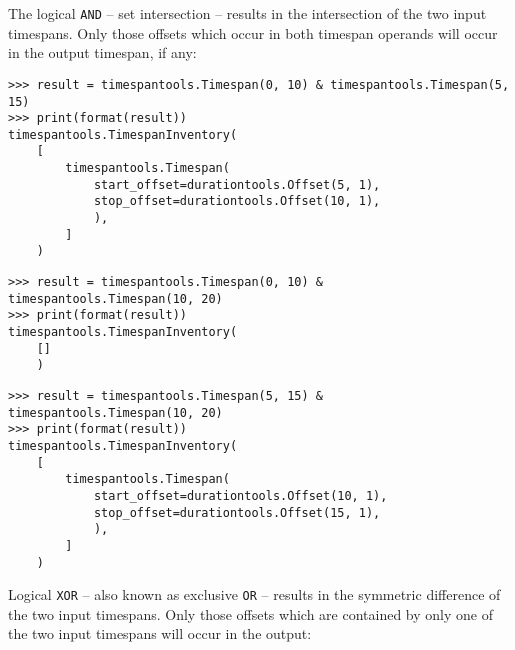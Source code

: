 \noindent The logical \texttt{AND} -- set intersection -- results in the
intersection of the two input timespans. Only those offsets which occur in both
timespan operands will occur in the output timespan, if any:

\begin{comment}
<abjad>
result = timespantools.Timespan(0, 10) & timespantools.Timespan(5, 15)
print(format(result))
result = timespantools.Timespan(0, 10) & timespantools.Timespan(10, 20)
print(format(result))
result = timespantools.Timespan(5, 15) & timespantools.Timespan(10, 20)
print(format(result))
</abjad>
\end{comment}

\begin{abjadbookoutput}
\begin{singlespacing}
\vspace{-0.5\baselineskip}
\begin{verbatim}
>>> result = timespantools.Timespan(0, 10) & timespantools.Timespan(5, 15)
>>> print(format(result))
timespantools.TimespanInventory(
    [
        timespantools.Timespan(
            start_offset=durationtools.Offset(5, 1),
            stop_offset=durationtools.Offset(10, 1),
            ),
        ]
    )
\end{verbatim}
\begin{verbatim}
>>> result = timespantools.Timespan(0, 10) & timespantools.Timespan(10, 20)
>>> print(format(result))
timespantools.TimespanInventory(
    []
    )
\end{verbatim}
\begin{verbatim}
>>> result = timespantools.Timespan(5, 15) & timespantools.Timespan(10, 20)
>>> print(format(result))
timespantools.TimespanInventory(
    [
        timespantools.Timespan(
            start_offset=durationtools.Offset(10, 1),
            stop_offset=durationtools.Offset(15, 1),
            ),
        ]
    )
\end{verbatim}
\end{singlespacing}
\end{abjadbookoutput}

\noindent Logical \texttt{XOR} -- also known as exclusive \texttt{OR} --
results in the symmetric difference of the two input timespans. Only those
offsets which are contained by only one of the two input timespans will occur
in the output:

\begin{comment}
<abjad>
result = timespantools.Timespan(0, 10) ^ timespantools.Timespan(5, 15)
print(format(result))
result = timespantools.Timespan(0, 10) ^ timespantools.Timespan(10, 20)
print(format(result))
result = timespantools.Timespan(5, 15) ^ timespantools.Timespan(10, 20)
print(format(result))
</abjad>
\end{comment}


